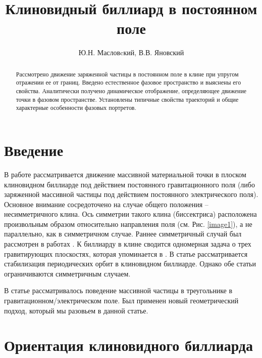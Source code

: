 \documentclass[a4paper]{article}
\title{Клиновидный биллиард в постоянном поле}
\author{Ю.Н. Масловcкий, В.В. Яновский}
\begin{document}
\maketitle

\begin{abstract}
Рассмотрено движение заряженной частицы в постоянном поле в клине при упругом отражении ее от границ. Введено естественное фазовое пространство и выяснены его свойства. Аналитически получено динамическое отображение, определяющее движение точки в фазовом пространстве. Установлены типичные свойства траекторий и общие характерные особенности фазовых портретов.
\end{abstract}

\section{Введение}

В работе рассматривается движение массивной материальной точки в плоском клиновидном биллиарде под действием постоянного гравитационного поля (либо заряженной массивной частицы под действием постоянного электрического поля). Основное внимание сосредоточено на случае общего положения -- несимметричного клина. Ось симметрии такого клина (биссектриса) расположена произвольным образом относительно направления поля (см. Рис. \ref{image1}), а не параллельно, как в симметричном случае.  Раннее симметричный случай был рассмотрен в работах \cite{Lehtihet1986,Sepulchre2003}.  К биллиарду в клине сводится одномерная задача о трех гравитирующих  плоскостях, которая упоминается в \cite{Lehtihet1986}. В статье \cite{Sepulchre2003} рассматривается стабилизация периодических орбит в клиновидном биллиарде.  Однако обе статьи ограничиваются симметричным случаем.

В статье \cite{Yanovskii2013}  рассматривалось поведение массивной частицы в треугольнике в гравитационном/электрическом поле. Был применен новый геометрический подход, который мы разовьем в данной статье.

\section{Ориентация клиновидного биллиарда}
\end{document}
